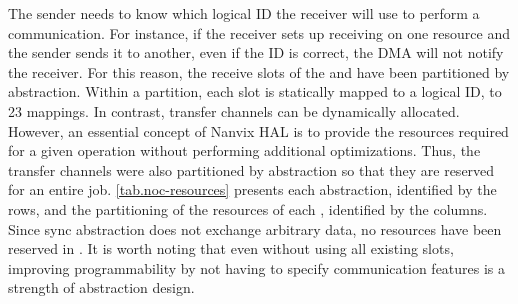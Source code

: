 
			The sender needs to know which logical ID the receiver will use to perform a communication. For instance, if the receiver sets up receiving on one \dnoc resource and the sender sends it to another, even if the ID is correct, the DMA will not notify the receiver. For this reason, the receive slots of the \cnoc and \dnoc have been partitioned by abstraction. Within a partition, each slot is statically mapped to a logical ID,  to 23 mappings. In contrast, transfer channels can be dynamically allocated. However, an essential concept of Nanvix HAL is to provide the resources required for a given operation without performing additional optimizations. Thus, the transfer channels were also partitioned by abstraction so that they are reserved for an entire job. \autoref{tab.noc-resources} presents each abstraction, identified by the rows, and the partitioning of the resources of each \noc, identified by the columns. Since sync abstraction does not exchange arbitrary data, no resources have been reserved in \dnoc. It is worth noting that even without using all existing slots, improving programmability by not having to specify communication features is a strength of abstraction design.

